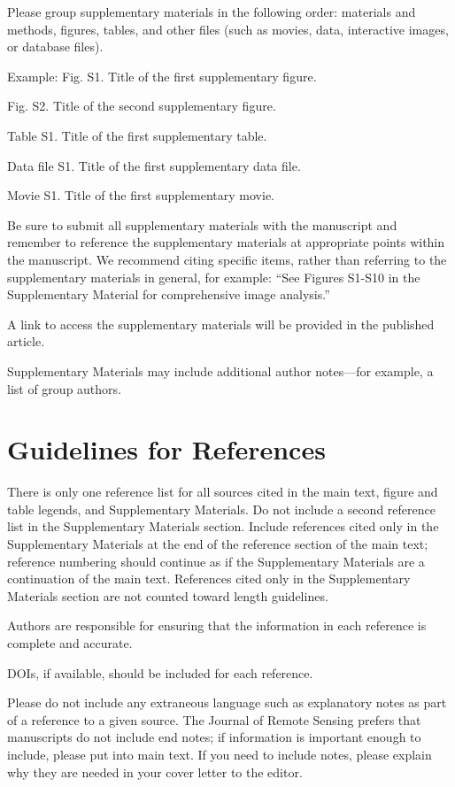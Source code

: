 \documentclass{article}
\begin{document}
Please group supplementary materials in the following order: materials and methods, figures, tables, and other files (such as movies, data, interactive images, or database files). 

\medskip Example:
Fig. S1. Title of the first supplementary figure.

Fig. S2. Title of the second supplementary figure.

Table S1. Title of the first supplementary table.

Data file S1. Title of the first supplementary data file.

Movie S1. Title of the first supplementary movie.

\medskip
Be sure to submit all supplementary materials with the manuscript and remember to reference the supplementary materials at appropriate points within the manuscript. We recommend citing specific items, rather than referring to the supplementary materials in general, for example: ``See Figures S1-S10 in the Supplementary Material for comprehensive image analysis.''

A link to access the supplementary materials will be provided in the published article.

Supplementary Materials may include additional author notes—for example, a list of group authors.

\section*{Guidelines for References}

There is only one reference list for all sources cited in the main text, figure and table legends, and Supplementary Materials. Do not include a second reference list in the Supplementary Materials section. Include references cited only in the Supplementary Materials at the end of the reference section of the main text; reference numbering should continue as if the Supplementary Materials are a continuation of the main text. References cited only in the Supplementary Materials section are not counted toward length guidelines.

Authors are responsible for ensuring that the information in each reference is complete and accurate.

DOIs, if available, should be included for each reference.

Please do not include any extraneous language such as explanatory notes as part of a reference to a given source. The Journal of Remote Sensing prefers that manuscripts do not include end notes; if information is important enough to include, please put into main text.  If you need to include notes, please explain why they are needed in your cover letter to the editor.

\printbibliography
\end{document}

